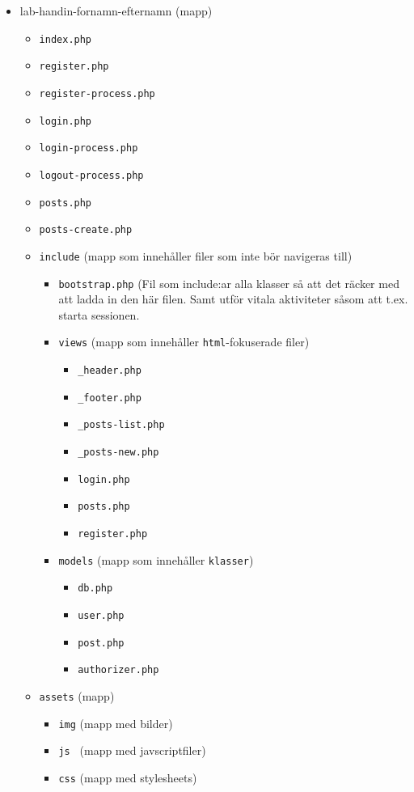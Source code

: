 \documentclass[12pt]{article}
\begin{document}
  \begin{itemize}
    \item lab-handin-fornamn-efternamn (mapp)
    \begin{itemize}
      \item \texttt{index.php}
      \item \texttt{register.php}
      \item \texttt{register-process.php}
      \item \texttt{login.php}
      \item \texttt{login-process.php}
      \item \texttt{logout-process.php}
      \item \texttt{posts.php}
      \item \texttt{posts-create.php}
      \item \texttt{include} (mapp som innehåller filer som inte bör navigeras till)
      \begin{itemize}
        \item \texttt{bootstrap.php} (Fil som include:ar alla klasser så att det räcker med att ladda in den här filen. Samt utför vitala aktiviteter såsom att t.ex. starta sessionen.
        \item \texttt{views} (mapp som innehåller \texttt{html}-fokuserade filer)
        \begin{itemize}
          \item \texttt{\_header.php}
          \item \texttt{\_footer.php}
          \item \texttt{\_posts-list.php}
          \item \texttt{\_posts-new.php}
          \item \texttt{login.php}
          \item \texttt{posts.php}
          \item \texttt{register.php}
        \end{itemize}
        \item \texttt{models} (mapp som innehåller \texttt{klasser})
        \begin{itemize}
          \item \texttt{db.php}
          \item \texttt{user.php}
          \item \texttt{post.php}
          \item \texttt{authorizer.php}
        \end{itemize}
      \end{itemize}
      \item \texttt{assets} (mapp)
      \begin{itemize}
        \item \texttt{img} (mapp med bilder)
        \item \texttt{js  } (mapp med javscriptfiler)
        \item \texttt{css} (mapp med stylesheets)
      \end{itemize}
    \end{itemize}
  \end{itemize}
\end{document}
